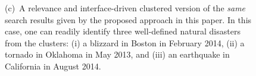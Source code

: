 \begin{figure}[t]
{(c)~A relevance and interface-driven clustered version of the \emph{same} search results given by the proposed approach in this paper.  In this case, one can readily identify three well-defined natural disasters from the clusters: (i) a blizzard in Boston in February 2014, (ii) a tornado in Oklahoma in May 2013, and (iii) an earthquake in California in August 2014.%
}
\label{Fig:UseCase}
\end{figure}


